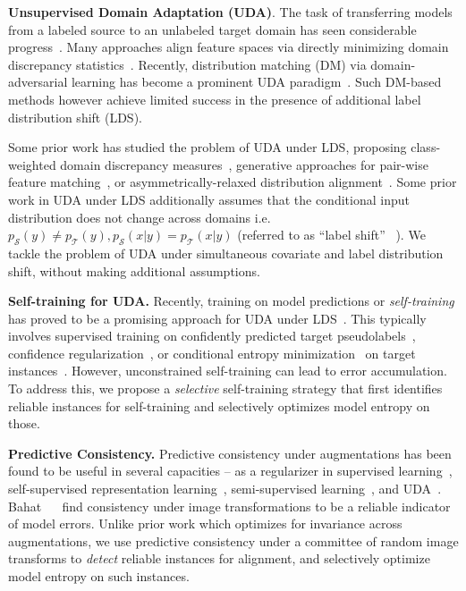 \documentclass[10pt,twocolumn,letterpaper]{article}
\newcommand{\source}{\mathcal{S}}  \newcommand{\target}{\mathcal{T}}  \newcommand{\numsamples}{N}
\begin{document}
\noindent\textbf{Unsupervised Domain Adaptation (UDA)}. The task of transferring models from a labeled source to an unlabeled target domain has seen considerable progress~\cite{ganin2014unsupervised,hoffman2017cycada,saenko2010adapting,tzeng2014deep}. Many approaches align feature spaces via directly minimizing domain discrepancy statistics~\cite{kang2019contrastive,long2015learning,tzeng2014deep}. Recently, distribution matching (DM) via domain-adversarial learning has become a prominent UDA paradigm~\cite{ganin2014unsupervised,long2018conditional,saito2018adversarial,tzeng2017adversarial,zhang2019bridging}. Such DM-based methods however achieve limited success in the presence of additional label distribution shift (LDS). 

Some prior work has studied the problem of UDA under LDS, proposing class-weighted domain discrepancy measures~\cite{wang2017balanced,yan2017mind}, generative approaches for pair-wise feature matching~\cite{takahashi2020partially}, or asymmetrically-relaxed distribution alignment~\cite{you2019universal}. Some prior work in UDA under LDS additionally assumes that the conditional input distribution does not change across domains i.e. $p_\source(y)\neq p_\target(y), p_\source(x|y)=p_\target(x|y)$ (referred to as ``label shift'' ~\cite{azizzadenesheli2018regularized,lipton2018detecting,tachet2020domain}). We tackle the problem of UDA under simultaneous covariate and label distribution shift, without making additional assumptions.

\noindent \textbf{Self-training for UDA.} Recently, training on model predictions or \emph{self-training} has proved to be a promising approach for UDA under LDS~\cite{tan2019generalized,li2020rethinking}. This typically involves supervised training on confidently predicted target pseudolabels~\cite{tan2019generalized}, confidence regularization~\cite{zou2019confidence}, or conditional entropy minimization~\cite{grandvalet2005semi} on target instances~\cite{li2020rethinking}. However, unconstrained self-training can lead to error accumulation. To address this, we propose a \emph{selective} self-training strategy that first identifies reliable instances for self-training and selectively optimizes model entropy on those.

 
\noindent\textbf{Predictive Consistency.} Predictive consistency under augmentations has been found to be useful in several capacities -- as a regularizer in supervised learning~\cite{cubuk2020randaugment}, self-supervised representation learning~\cite{chen2020simple}, semi-supervised learning~\cite{sajjadi2016regularization,berthelot2019mixmatch,xie2020unsupervised,sohn2020fixmatch}, and UDA~\cite{li2020rethinking}. Bahat ~\etal~\cite{bahat2019natural} find consistency under image transformations to be a reliable indicator of model errors.
Unlike prior work which optimizes for invariance across augmentations, we use predictive consistency under a committee of random image transforms to \emph{detect} reliable instances for alignment, and selectively optimize model entropy on such instances.
 \vspace{-5pt}
\end{document}
